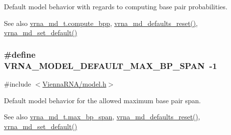 Default model behavior with regards to computing base pair probabilities. 

\begin{DoxySeeAlso}{See also}
\hyperlink{group__model__details_aa0c3e03d9064363e27adcc92b8d0380f}{vrna\+\_\+md\+\_\+t.\+compute\+\_\+bpp}, \hyperlink{group__model__details_ga70834424cf804d149937de89f80ceb45}{vrna\+\_\+md\+\_\+defaults\+\_\+reset()}, \hyperlink{group__model__details_ga8ac6ff84936282436f822644bf841f66}{vrna\+\_\+md\+\_\+set\+\_\+default()} 
\end{DoxySeeAlso}
\hypertarget{group__model__details_ga7cb6f4ae8fdebff6746a4410814f2977}{}
\subsubsection[{V\+R\+N\+A\+\_\+\+M\+O\+D\+E\+L\+\_\+\+D\+E\+F\+A\+U\+L\+T\+\_\+\+M\+A\+X\+\_\+\+B\+P\+\_\+\+S\+P\+A\+N}]{\setlength{\rightskip}{0pt plus 5cm}\#define V\+R\+N\+A\+\_\+\+M\+O\+D\+E\+L\+\_\+\+D\+E\+F\+A\+U\+L\+T\+\_\+\+M\+A\+X\+\_\+\+B\+P\+\_\+\+S\+P\+A\+N~-\/1}\label{group__model__details_ga7cb6f4ae8fdebff6746a4410814f2977}


{\ttfamily \#include $<$\hyperlink{model_8h}{Vienna\+R\+N\+A/model.\+h}$>$}



Default model behavior for the allowed maximum base pair span. 

\begin{DoxySeeAlso}{See also}
\hyperlink{group__model__details_a659e5fcc6e8c9f1a68e7de6548eef3b0}{vrna\+\_\+md\+\_\+t.\+max\+\_\+bp\+\_\+span}, \hyperlink{group__model__details_ga70834424cf804d149937de89f80ceb45}{vrna\+\_\+md\+\_\+defaults\+\_\+reset()}, \hyperlink{group__model__details_ga8ac6ff84936282436f822644bf841f66}{vrna\+\_\+md\+\_\+set\+\_\+default()} 
\end{DoxySeeAlso}
\hypertarget{group__model__details_ga8de04a9cb57e811e313b0f9f207f6bdb}{}
